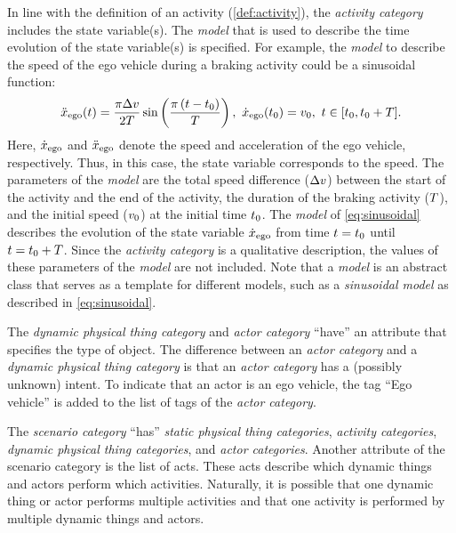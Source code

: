 In line with the definition of an activity (\cref{def:activity}), the \textit{activity category} includes the state variable(s).
The \textit{model} that is used to describe the time evolution of the state  variable(s) is specified. For example, the \textit{model} to describe the speed of the ego vehicle during a braking activity could be a sinusoidal function:
\begin{equation} \label{eq:sinusoidal}
	\egoacceleration(\time) = \frac{\pi \amplitude}{2\duration} \sin \left( \frac{\pi \left( \time - \inittime\right)}{\duration} \right),\ \egospeed(\inittime) = \egospeedinit,\ \time \in [\inittime, \inittime+\duration].
\end{equation}
Here, $\dot{x}_{\mathrm{ego}}$ and $\ddot{x}_{\mathrm{ego}}$ denote the speed and acceleration of the ego vehicle, respectively. Thus, in this case, the state variable corresponds to the speed. 
The parameters of the \textit{model} are the total speed difference ($\Delta v$) between the start of the activity and the end of the activity, the duration of the braking activity ($T$), and the initial speed ($v_{0}$) at the initial time $t_{0}$. 
The \textit{model} of \cref{eq:sinusoidal} describes the evolution of the state variable $\dot{x}_{\mathrm{ego}}$ from time $t=t_{0}$ until $t=t_{0}+T$. Since the \textit{activity category} is a qualitative description, the values of these parameters of the \textit{model} are not included.
\cstartb Note that a \textit{model} is an abstract class that serves as a template for different models, such as a \textit{sinusoidal model} as described in \cref{eq:sinusoidal}. \cendb

The \cstartb \textit{dynamic physical thing category} and \cendb \textit{actor category} ``have'' an attribute that specifies the type of object.
\cstartb The difference between an \textit{actor category} and a \textit{dynamic physical thing category} is that an \textit{actor category} has a (possibly unknown) intent. \cendb
To indicate that an actor is an ego vehicle, the tag ``Ego vehicle'' is added to the list of tags of the \textit{actor category}.

The \textit{scenario category} ``has'' \cstartc \textit{static physical thing categories}\cendc, \textit{activity categories}, \cstartb \textit{dynamic physical thing categories}, \cendb and \textit{actor categories}. 
Another attribute of the scenario category is the list of acts. %
These acts describe which \cstartb dynamic things and \cendb actors perform which activities. Naturally, it is possible that one \cstartb dynamic thing or \cendb actor performs multiple activities and that one activity is performed by multiple \cstartb dynamic things and \cendb actors.

